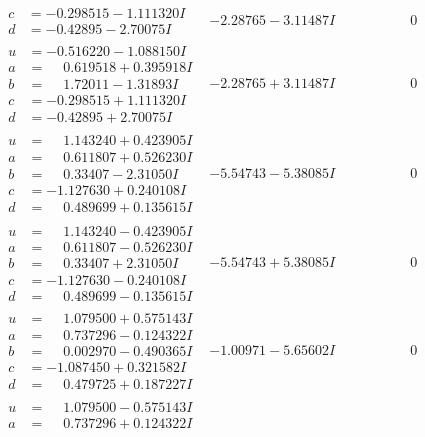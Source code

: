 \documentclass[1p]{elsarticle_modified}
\theoremstyle{definition}
\begin{document}
$$\begin{array}{c|c|c}
\begin{aligned}
c &= -0.298515 - 1.111320 I \\
d &= -0.42895 - 2.70075 I\end{aligned}
 & -2.28765 - 3.11487 I & \phantom{-0.000000 } 0 \\ \hline\begin{aligned}
u &= -0.516220 - 1.088150 I \\
a &= \phantom{-}0.619518 + 0.395918 I \\
b &= \phantom{-}1.72011 - 1.31893 I \\
c &= -0.298515 + 1.111320 I \\
d &= -0.42895 + 2.70075 I\end{aligned}
 & -2.28765 + 3.11487 I & \phantom{-0.000000 } 0 \\ \hline\begin{aligned}
u &= \phantom{-}1.143240 + 0.423905 I \\
a &= \phantom{-}0.611807 + 0.526230 I \\
b &= \phantom{-}0.33407 - 2.31050 I \\
c &= -1.127630 + 0.240108 I \\
d &= \phantom{-}0.489699 + 0.135615 I\end{aligned}
 & -5.54743 - 5.38085 I & \phantom{-0.000000 } 0 \\ \hline\begin{aligned}
u &= \phantom{-}1.143240 - 0.423905 I \\
a &= \phantom{-}0.611807 - 0.526230 I \\
b &= \phantom{-}0.33407 + 2.31050 I \\
c &= -1.127630 - 0.240108 I \\
d &= \phantom{-}0.489699 - 0.135615 I\end{aligned}
 & -5.54743 + 5.38085 I & \phantom{-0.000000 } 0 \\ \hline\begin{aligned}
u &= \phantom{-}1.079500 + 0.575143 I \\
a &= \phantom{-}0.737296 - 0.124322 I \\
b &= \phantom{-}0.002970 - 0.490365 I \\
c &= -1.087450 + 0.321582 I \\
d &= \phantom{-}0.479725 + 0.187227 I\end{aligned}
 & -1.00971 - 5.65602 I & \phantom{-0.000000 } 0 \\ \hline\begin{aligned}
u &= \phantom{-}1.079500 - 0.575143 I \\
a &= \phantom{-}0.737296 + 0.124322 I \\

\end{aligned}
\end{array}$$
\end{document}
